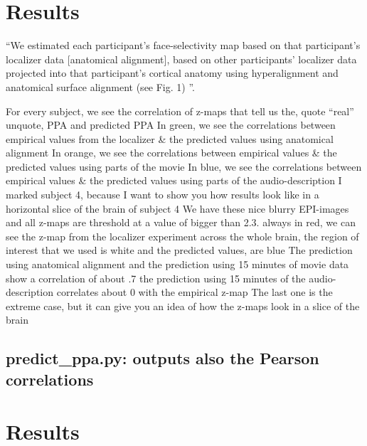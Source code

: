 \section{Results}





``We estimated each participant's face-selectivity map based on that
participant’s localizer data [anatomical alignment], based on other
participants' localizer data projected into that participant's cortical anatomy
using hyperalignment and anatomical surface alignment (see Fig. 1) \citep{jiahui2020predicting}''.

%
For every subject, we see the correlation of z-maps that tell us the, quote
``real'' unquote, PPA and predicted PPA
%
In green, we see the correlations between empirical values from the localizer \&
the predicted values using anatomical alignment
%
In orange, we see the correlations between empirical values \& the predicted
values using parts of the movie
%
In blue, we see the correlations between empirical values \& the predicted
values using parts of the audio-description
%
I marked subject 4, because I want to show you how results look like in a
horizontal slice of the brain of subject 4
%
We have these nice blurry EPI-images and all z-maps are threshold at a value of
bigger than 2.3.
%
always in red, we can see the z-map from the localizer experiment across the
whole brain,
%
the region of interest that we used is white and the predicted values, are blue
%
The prediction using anatomical alignment and the prediction using 15 minutes of
movie data show a correlation of about .7
%
the prediction using 15 minutes of the audio-description correlates about 0 with
the empirical z-map
%
The last one is the extreme case, but it can give you an idea of how the z-maps
look in a slice of the brain


\subsection{predict\_ppa.py: outputs also the Pearson correlations}


\section{Results}

